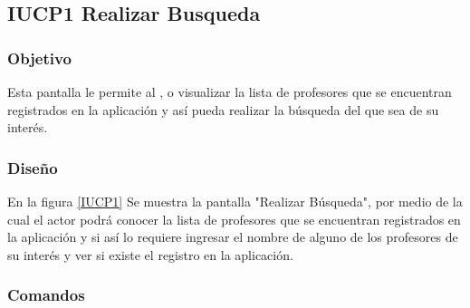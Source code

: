 \subsection{IUCP1 Realizar Busqueda}

\subsubsection{Objetivo}

Esta pantalla le permite al ,  o   visualizar la lista de profesores que se encuentran registrados en la aplicación y así pueda realizar la búsqueda del que sea de su interés. 


\subsubsection{Diseño}
En la figura \ref{IUCP1} Se muestra la pantalla "Realizar Búsqueda", por medio de la cual el actor podrá conocer la lista de profesores que se encuentran registrados en la aplicación y si así lo requiere ingresar el nombre de alguno de los profesores de su interés  y ver si existe el registro en la aplicación. 



\subsubsection{Comandos}


